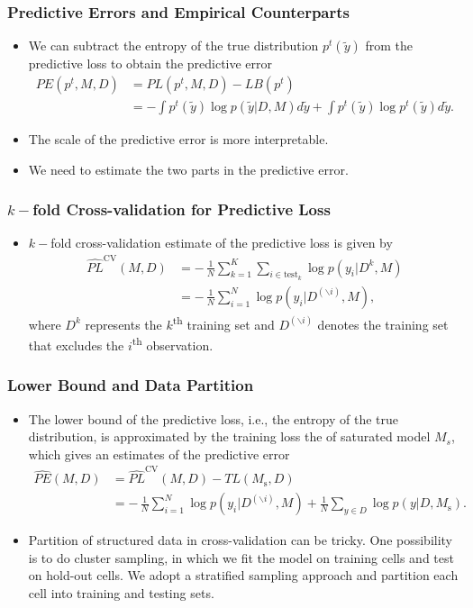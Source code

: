 \documentclass[xetex,mathserif,serif]{beamer}
\begin{document}
\begin{frame}
  \frametitle{Predictive Errors and Empirical Counterparts}
  \begin{itemize}
  \item We can subtract the entropy of the true distribution $p^t(\tilde y)$
    from the predictive loss to obtain the predictive error
    \begin{align*}
      PE(p^t, M, D)&= PL(p^t, M, D) - LB(p^t) \\  
      &=-\int p^t(\tilde y) \log p(\tilde y|D, M) d\tilde y+\int p^t(\tilde y) \log p^t(\tilde y) d\tilde y.
    \end{align*}
  \item The scale of the predictive error is more interpretable.
  \item We need to estimate the two parts in the predictive error.
  \end{itemize}
\end{frame}

\begin{frame}
  \frametitle{$k-$fold Cross-validation for Predictive Loss}
  \begin{itemize}
  \item $k-$fold cross-validation estimate of the predictive loss is given by
    \begin{align*}
      \widehat{PL}^{\text{CV}}(M, D) &=-\,\frac{1}{N}\sum_{k=1}^K\sum_{i\in
        \text{test}_k}\log p(y_i|D^k, M)\\
      &=-\,\frac{1}{N}\sum_{i=1}^N\log p(y_i|D^{(\backslash i)}, M),
\end{align*}
where $D^k$ represents the $k$\textsuperscript{th} training set and
$D^{(\backslash i)}$ denotes the training set that excludes the
$i$\textsuperscript{th} observation.
  \end{itemize}
\end{frame}

\begin{frame}
  \frametitle{Lower Bound and Data Partition}
  \begin{itemize}
  \item The lower bound of the predictive loss, i.e., the entropy of the true
    distribution, is approximated by the training loss the of saturated model
    $M_s$, which gives an estimates of the predictive error
    \begin{align*}
      \widehat{PE}(M, D)&=\widehat{PL}^{\text{CV}}(M,D)-TL(M_{\text{s}},D)\\  \label{eq:esti_preerror}
      &= -\,\frac{1}{N}\sum_{i=1}^N\log p(y_i|D^{(\backslash i)},
      M)+\frac{1}{N}\sum_{y\in D}\log p(y | D, M_{\text{s}}).
    \end{align*}
  \item Partition of structured data in cross-validation can be tricky. One
    possibility is to do cluster sampling, in which we fit the model on training
    cells and test on hold-out cells. We adopt a stratified sampling approach and
    partition each cell into training and testing sets.
  \end{itemize}
\end{frame}
\end{document}
